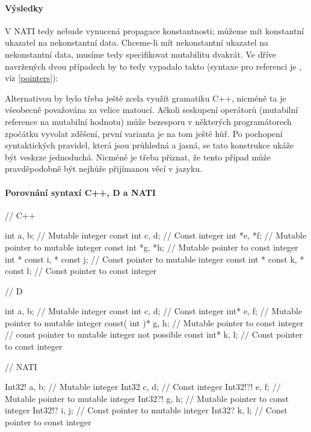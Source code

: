 \paragraph{Výsledky} V NATI tedy nebude vynucená propagace konstantnosti; můžeme mít konstantní ukazatel na nekonstantní data. Chceme-li mít nekonstantní ukazatel na nekonstantní data, musíme tedy specifikovat mutabilitu dvakrát. Ve dříve navržených dvou případech by to tedy vypadalo takto (syntaxe pro referenci je , viz \ref{pointers}):
\begin{compactenum}
	\item {}
	\item {}
\end{compactenum}

Alternativou by bylo třeba ještě zcela využít gramatiku C++, nicméně ta je všeobecně považována za velice matoucí. Ačkoli seskupení operátorů  (mutabilní reference na mutabilní hodnotu) může bezesporu v některých programátorech zpočátku vyvolat zděšení, první varianta je na tom ještě hůř. Po pochopení syntaktických pravidel, která jsou průhledná a jasná, se tato konstrukce ukáže být veskrze jednoduchá. Nicméně je třeba přiznat, že tento případ může pravděpodobně být nejhůře přijímanou věcí v jazyku.

\paragraph{Porovnání syntaxí C++, D a NATI}
\begin{cppcode}
// C++

int a, b; // Mutable integer
const int c, d; // Const integer
int *e, *f; // Mutable pointer to mutable integer
const int *g, *h; // Mutable pointer to const integer
int * const i, * const j; // Const pointer to mutable integer
const int * const k, * const l; // Const pointer to const integer

\end{cppcode}
\begin{dcode}
// D

int a, b; // Mutable integer
const int c, d; // Const integer
int* e, f; // Mutable pointer to mutable integer
const( int )* g, h; // Mutable pointer to const integer
// const pointer to mutable integer not possible
const int* k, l; // Const pointer to const integer
\end{dcode}
\begin{code}
// NATI

Int32! a, b; // Mutable integer
Int32 c, d; // Const integer
Int32!?! e, f; // Mutable pointer to mutable integer
Int32?! g, h; // Mutable pointer to const integer
Int32!? i, j; // Const pointer to mutable integer
Int32? k, l; // Const pointer to const integer
\end{code}


